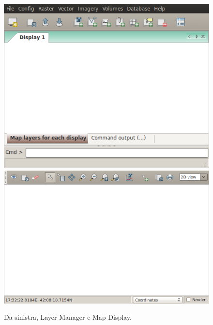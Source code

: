 		\begin{figure}
			\centering
			\includegraphics[scale=0.31]{img/screenshot_003}
			\qquad{}
			\includegraphics[scale=0.3]{img/screenshot_002}
			\caption{{\small \label{fig:Da-sinistra,-Layer}Da sinistra, Layer Manager e Map Display.}}
		\end{figure}

